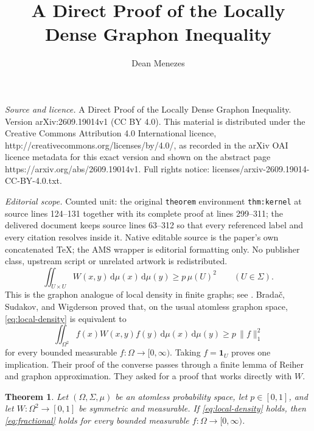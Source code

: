 \documentclass[10pt,a4paper]{amsart}
\newtheorem{theorem}{Theorem}
\newcommand{\one}{\mathbf 1}
\newcommand{\dd}{\,\mathrm d}
\newcommand{\normone}[1]{\lVert #1\rVert_1}
\begin{document}
\title[A Direct Proof of the Locally Dense Graphon Inequality]{A Direct Proof of the Locally Dense Graphon Inequality}
\author{Dean Menezes}
\date{}
\maketitle
\noindent\emph{Source and licence.} A Direct Proof of the Locally Dense Graphon Inequality. Version arXiv:2609.19014v1 (CC BY 4.0). This material is distributed under the Creative Commons Attribution 4.0 International licence, http://creativecommons.org/licenses/by/4.0/, as recorded in the arXiv OAI licence metadata for this exact version and shown on the abstract page https://arxiv.org/abs/2609.19014v1. Full rights notice: licenses/arxiv-2609.19014-CC-BY-4.0.txt.\par\smallskip
\noindent\textit{Editorial scope.} Counted unit: the original \texttt{theorem} environment \texttt{thm:kernel} at source lines 124--131 together with its complete proof at lines 299--311; the delivered document keeps source lines 63--312 so that every referenced label and every citation resolves inside it. Native editable source is the paper's own concatenated TeX; the AMS wrapper is editorial formatting only. No publisher class, upstream script or unrelated artwork is redistributed.
\begin{equation}\label{eq:local-density}
  \iint_{U\times U}W(x,y)\dd\mu(x)\dd\mu(y)
  \geq p\,\mu(U)^2
  \qquad(U\in\Sigma).
\end{equation}
This is the graphon analogue of local density in finite graphs; see
\cite{Lovasz}. Brada\v{c}, Sudakov, and Wigderson
\cite[Lemma~2.8]{BSW} proved that, on the usual atomless graphon space,
\eqref{eq:local-density} is equivalent to
\begin{equation}\label{eq:fractional}
  \iint_{\Omega^2}f(x)W(x,y)f(y)\dd\mu(x)\dd\mu(y)
  \geq p\,\normone{f}^{2}
\end{equation}
for every bounded measurable $f\colon\Omega\to[0,\infty)$. Taking
$f=\one_U$ proves one implication. Their proof of the converse passes through
a finite lemma of Reiher \cite{Reiher} and graphon approximation. They asked
for a proof that works directly with $W$.

\begin{theorem}\label{thm:main}
Let $(\Omega,\Sigma,\mu)$ be an atomless probability space, let $p\in[0,1]$,
and let $W\colon\Omega^2\to[0,1]$ be symmetric and measurable. If
\eqref{eq:local-density} holds, then \eqref{eq:fractional} holds for every
bounded measurable $f\colon\Omega\to[0,\infty)$.
\end{theorem}
\end{document}
